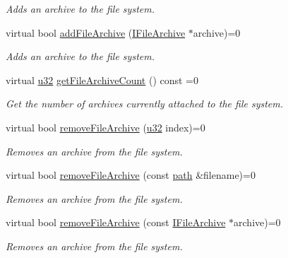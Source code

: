 \begin{DoxyCompactItemize}
\begin{DoxyCompactList}\small\item\em Adds an archive to the file system. \end{DoxyCompactList}\item 
virtual bool \hyperlink{classirr_1_1io_1_1IFileSystem_aedecc2c6f4c567de8bbe54fd711f7143}{add\+File\+Archive} (\hyperlink{classirr_1_1io_1_1IFileArchive}{I\+File\+Archive} $\ast$archive)=0
\begin{DoxyCompactList}\small\item\em Adds an archive to the file system. \end{DoxyCompactList}\item 
\mbox{\label{classirr_1_1io_1_1IFileSystem_a85862865f72b1e187402365e4236dce0}} 
virtual \hyperlink{namespaceirr_a0416a53257075833e7002efd0a18e804}{u32} \hyperlink{classirr_1_1io_1_1IFileSystem_a85862865f72b1e187402365e4236dce0}{get\+File\+Archive\+Count} () const =0
\begin{DoxyCompactList}\small\item\em Get the number of archives currently attached to the file system. \end{DoxyCompactList}\item 
virtual bool \hyperlink{classirr_1_1io_1_1IFileSystem_aa509623756c9bcbc3a9bcf455ea2a3ba}{remove\+File\+Archive} (\hyperlink{namespaceirr_a0416a53257075833e7002efd0a18e804}{u32} index)=0
\begin{DoxyCompactList}\small\item\em Removes an archive from the file system. \end{DoxyCompactList}\item 
virtual bool \hyperlink{classirr_1_1io_1_1IFileSystem_a03b405c8f5346c225c590cde585eb73c}{remove\+File\+Archive} (const \hyperlink{namespaceirr_1_1io_ab1bdc45edb3f94d8319c02bc0f840ee1}{path} \&filename)=0
\begin{DoxyCompactList}\small\item\em Removes an archive from the file system. \end{DoxyCompactList}\item 
virtual bool \hyperlink{classirr_1_1io_1_1IFileSystem_ab7579f5ccca7bc7c1e079f5cb38173ed}{remove\+File\+Archive} (const \hyperlink{classirr_1_1io_1_1IFileArchive}{I\+File\+Archive} $\ast$archive)=0
\begin{DoxyCompactList}\small\item\em Removes an archive from the file system. \end{DoxyCompactList}\item 

\end{DoxyCompactItemize}
